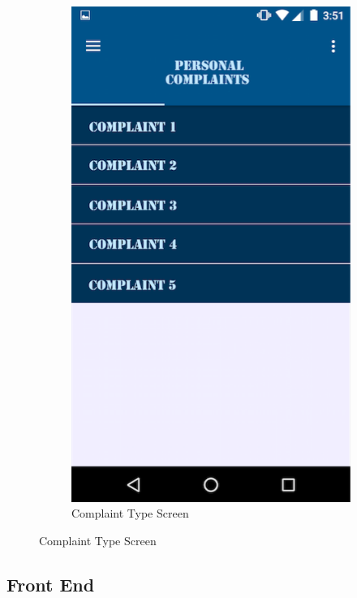 \documentclass{article}
\begin{document}
	    \begin{figure}[H]
      \centering
      \begin{subfigure}{.5\textwidth}
          \centering
		\includegraphics[width=0.9\linewidth]{test1complaints.png}
          \caption{Complaint Type Screen}
          \label{fig:sub1}
      \end{subfigure}%
      \label{figstart}
    \end{figure}

    	\subsection{Front End}
\end{document}
